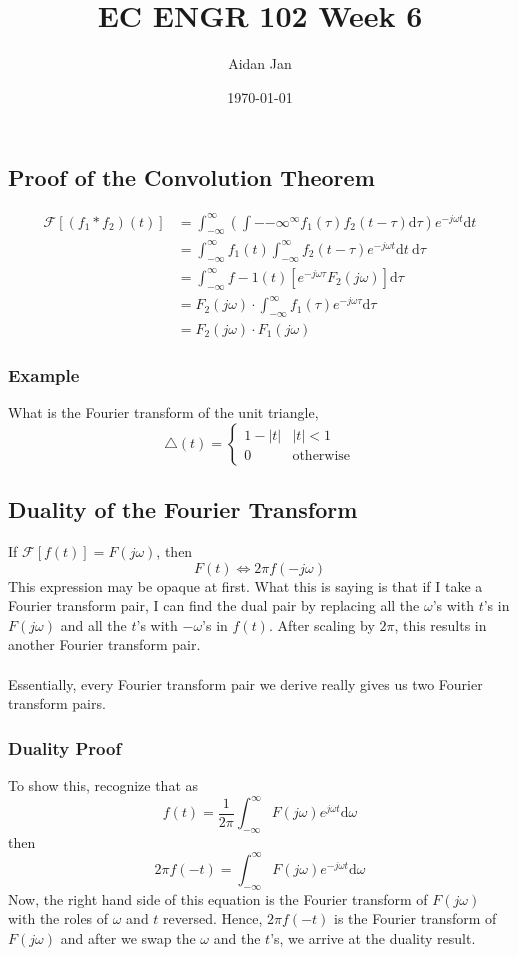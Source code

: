 \documentclass[10pt]{article}
\title{EC ENGR 102 Week 6}
\author{Aidan Jan}
\date{\today}
\begin{document}
\maketitle

\subsection*{Proof of the Convolution Theorem}
\begin{align*}
    \mathcal{F}[(f_1 * f_2)(t)] &= \int_{-\infty}^\infty \left(\int-{-\infty}^\infty f_1(\tau) f_2(t - \tau) \text{d}\tau\right) e^{-j\omega t} \text{d}t\\
    &= \int_{-\infty}^\infty f_1(t) \int_{-\infty}^\infty f_2(t-\tau) e^{-j\omega t} \text{d}t \:\text{d}\tau\\
    &= \int_{-\infty}^\infty f-1(t) \left[e^{-j\omega \tau} F_2(j\omega)\right] \text{d}\tau\\
    &= F_2(j\omega) \cdot \int_{-\infty}^\infty f_1(\tau) e^{-j\omega \tau} \text{d}\tau\\
    &= F_2(j\omega) \cdot F_1(j\omega)
\end{align*}

\subsubsection*{Example}
What is the Fourier transform of the unit triangle,
\[\triangle(t)=\begin{cases} 1-|t|& |t|<1 \\ 0 & \text{otherwise}\end{cases}\]

\subsection*{Duality of the Fourier Transform}
If $\mathcal{F}[f(t)] = F(j\omega)$, then
\[\boxed{F(t) \Longleftrightarrow 2\pi f(-j\omega)}\]
This expression may be opaque at first.  What this is saying is that if I take a Fourier transform pair, I can find the dual pair by replacing all the $\omega$'s with $t$'s in $F(j\omega)$ and all the $t$'s with $-\omega$'s in $f(t)$.  After scaling by $2\pi$, this results in another Fourier transform pair.\\\\
Essentially, every Fourier transform pair we derive really gives us two Fourier transform pairs.

\subsubsection*{Duality Proof}
To show this, recognize that as
\[f(t) = \frac{1}{2\pi} \int_{-\infty}^\infty F(j\omega) e^{j\omega t} \text{d}\omega\]
then
\[2\pi f(-t) = \int_{-\infty}^\infty F(j\omega) e^{-j\omega t} \text{d}\omega\]
Now, the right hand side of this equation is the Fourier transform of $F(j\omega)$ with the roles of $\omega$ and $t$ reversed.  Hence, $2\pi f(-t)$ is the Fourier transform of $F(j\omega)$ and after we swap the $\omega$ and the $t$'s, we arrive at the duality result.
\end{document}
